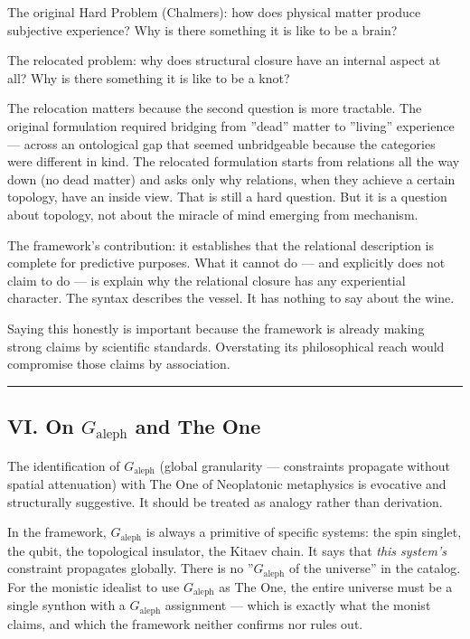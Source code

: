 \documentclass[12pt,a4paper]{article}
\begin{document}
The original Hard Problem (Chalmers): how does physical matter produce subjective experience? Why is there something it is like to be a brain?

The relocated problem: why does structural closure have an internal aspect at all? Why is there something it is like to be a knot?

The relocation matters because the second question is more tractable. The original formulation required bridging from ''dead'' matter to ''living'' experience --- across an ontological gap that seemed unbridgeable because the categories were different in kind. The relocated formulation starts from relations all the way down (no dead matter) and asks only why relations, when they achieve a certain topology, have an inside view. That is still a hard question. But it is a question about topology, not about the miracle of mind emerging from mechanism.

The framework's contribution: it establishes that the relational description is complete for predictive purposes. What it cannot do --- and explicitly does not claim to do --- is explain why the relational closure has any experiential character. The syntax describes the vessel. It has nothing to say about the wine.

Saying this honestly is important because the framework is already making strong claims by scientific standards. Overstating its philosophical reach would compromise those claims by association.

\begin{center}
\rule{0.5\textwidth}{0.4pt}
\end{center}

\subsection{VI. On $G_\text{aleph}$ and The One}

The identification of $G_\text{aleph}$ (global granularity --- constraints propagate without spatial attenuation) with The One of Neoplatonic metaphysics is evocative and structurally suggestive. It should be treated as analogy rather than derivation.

In the framework, $G_\text{aleph}$ is always a primitive of specific systems: the spin singlet, the qubit, the topological insulator, the Kitaev chain. It says that \emph{this system's} constraint propagates globally. There is no ''$G_\text{aleph}$ of the universe'' in the catalog. For the monistic idealist to use $G_\text{aleph}$ as The One, the entire universe must be a single synthon with a $G_\text{aleph}$ assignment --- which is exactly what the monist claims, and which the framework neither confirms nor rules out.
\end{document}
